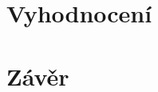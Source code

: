 \documentclass[a4paper, 12pt]{article}
\begin{document}

\section{Vyhodnocení}



\section{Závěr}




\begin{flushleft}
  
\end{flushleft}

\end{document}
